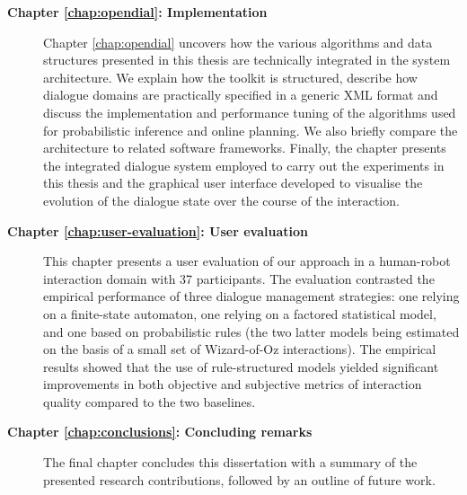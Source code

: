 \begin{description}
\item [\textbf{Chapter \ref{chap:opendial}: Implementation}] \hfill  \vspace{2mm}

Chapter \ref{chap:opendial} uncovers how the various algorithms and data structures presented in this thesis are technically integrated in the system architecture.  We explain how the \opendial toolkit is structured, describe how dialogue domains are practically specified in a generic XML format and discuss the implementation and performance tuning of the algorithms used for probabilistic inference and online planning.  We also briefly compare the \opendial architecture to related software frameworks.  Finally, the chapter presents the integrated dialogue system employed to carry out the experiments in this thesis and the graphical user interface developed to visualise the evolution of the dialogue state over the course of the interaction. 

\item [\textbf{Chapter \ref{chap:user-evaluation}: User evaluation}] \hfill  \vspace{2mm}

This chapter presents a user evaluation of our approach in a human-robot interaction domain with 37 participants.  The evaluation   contrasted the empirical performance of three dialogue management strategies: one relying on a finite-state automaton, one relying on a factored statistical model, and one based on probabilistic rules (the two latter models being estimated on the basis of a small set of Wizard-of-Oz interactions).  The empirical results showed that the use of rule-structured models yielded significant improvements in both objective and subjective metrics of interaction quality compared to the two baselines. \vspace{2mm}


\item [\textbf{Chapter \ref{chap:conclusions}: Concluding remarks}] \hfill  \vspace{2mm}

The final chapter concludes this dissertation with a summary of the presented research contributions, followed by an outline of future work.   \vspace{2mm}

\end{description}

